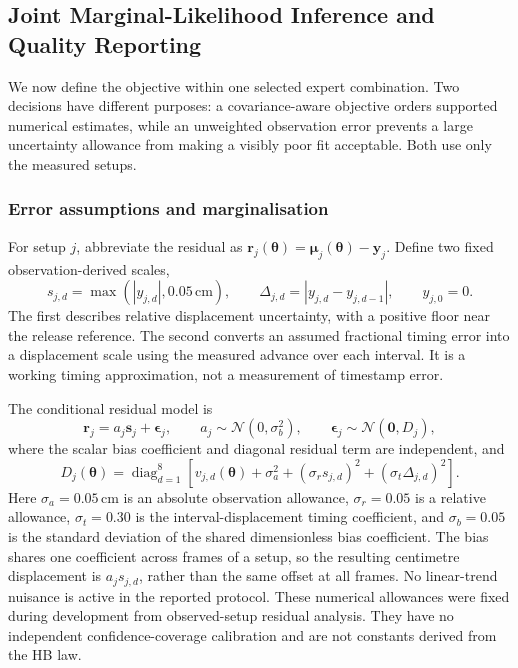 \subsection{Joint Marginal-Likelihood Inference and Quality Reporting}
\label{sec:inverse}

We now define the objective within one selected expert combination.
Two decisions have different purposes: a covariance-aware objective
orders supported numerical estimates, while an unweighted observation
error prevents a large uncertainty allowance from making a visibly poor
fit acceptable. Both use only the measured setups.

\subsubsection{Error assumptions and marginalisation}
\label{sec:inv-loss}
For setup $j$, abbreviate the residual as
$\mathbf r_j(\boldsymbol\theta)=\boldsymbol\mu_j(\boldsymbol\theta)-\mathbf y_j$.
Define two fixed observation-derived scales,
\begin{equation}
\label{eq:inverse-observation-scales}
 s_{j,d}=\max(|y_{j,d}|,0.05\,\mathrm{cm}),\qquad
 \Delta_{j,d}=|y_{j,d}-y_{j,d-1}|,\qquad y_{j,0}=0.
\end{equation}
The first describes relative displacement uncertainty, with a positive
floor near the release reference. The second converts an assumed
fractional timing error into a displacement scale using the measured
advance over each interval. It is a working timing approximation, not a
measurement of timestamp error.

The conditional residual model is
\begin{equation}
\label{eq:inverse-nuisance-model}
 \mathbf r_j=a_j\mathbf s_j+\boldsymbol\epsilon_j,\qquad
 a_j\sim\mathcal N(0,\sigma_b^2),\qquad
 \boldsymbol\epsilon_j\sim\mathcal N(\mathbf0,D_j),
\end{equation}
where the scalar bias coefficient and diagonal residual term are independent,
and
\begin{equation}
\label{eq:inverse-diagonal-budget}
 D_j(\boldsymbol\theta)=\operatorname{diag}_{d=1}^{8}
 \left[v_{j,d}(\boldsymbol\theta)+\sigma_a^2
             +(\sigma_r s_{j,d})^2+(\sigma_t\Delta_{j,d})^2\right].
\end{equation}
Here $\sigma_a=0.05$\,cm is an absolute observation allowance,
$\sigma_r=0.05$ is a relative allowance, $\sigma_t=0.30$ is the
interval-displacement timing coefficient, and $\sigma_b=0.05$ is the
standard deviation of the shared dimensionless bias coefficient.
The bias shares one coefficient across frames of a setup, so the resulting
centimetre displacement is $a_js_{j,d}$, rather than the same offset at
all frames. No linear-trend nuisance is active in the reported protocol.
These numerical allowances were fixed during development from
observed-setup residual analysis. They have no independent confidence-coverage
calibration and are not constants derived from the HB law.

